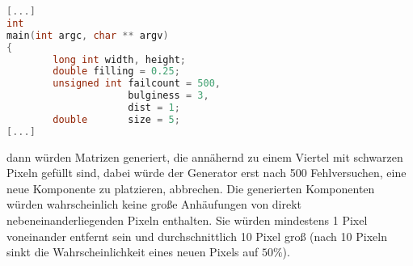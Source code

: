 \begin{lstlisting}[language=C, aboveskip=\baselineskip, basicstyle=\footnotesize\ttfamily, lineskip=0pt]
[...]
int
main(int argc, char ** argv)
{
        long int width, height;
        double filling = 0.25;
        unsigned int failcount = 500,
                     bulginess = 3,
                     dist = 1;
        double       size = 5;
[...]
\end{lstlisting}

dann würden Matrizen generiert, die annähernd zu einem Viertel mit schwarzen Pixeln gefüllt sind, dabei würde der Generator erst nach 500 Fehlversuchen, eine neue Komponente zu platzieren, abbrechen. Die generierten Komponenten würden wahrscheinlich keine große Anhäufungen von direkt nebeneinanderliegenden Pixeln enthalten. Sie würden mindestens 1 Pixel voneinander entfernt sein und durchschnittlich 10 Pixel groß (nach 10 Pixeln sinkt die Wahrscheinlichkeit eines neuen Pixels auf $50\%$).